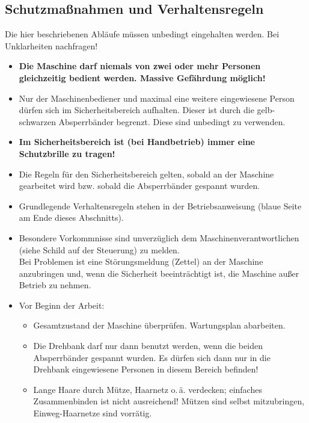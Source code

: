 \documentclass{\basedir/fablab-document}
\begin{document}
\subsection{Schutzmaßnahmen und Verhaltensregeln}
Die hier beschriebenen Abläufe müssen unbedingt eingehalten werden.
Bei Unklarheiten nachfragen!
\begin{itemize}
\item \textbf{Die Maschine darf niemals von zwei oder mehr Personen gleichzeitig bedient werden. Massive Gefährdung möglich!}
\item Nur der Maschinenbediener und maximal eine weitere eingewiesene Person dürfen sich im Sicherheitsbereich aufhalten. Dieser ist durch die gelb-schwarzen Absperrbänder begrenzt. Diese sind unbedingt zu verwenden.
\item \textbf{Im Sicherheitsbereich ist (bei Handbetrieb) immer eine Schutzbrille zu tragen!}
\item Die Regeln für den Sicherheitsbereich gelten, sobald an der Maschine gearbeitet wird bzw. sobald die Absperrbänder gespannt wurden.
\item Grundlegende Verhaltensregeln stehen in der Betriebsanweisung (blaue Seite am Ende dieses Abschnitts).
\item Besondere Vorkommnisse sind unverzüglich dem Maschinenverantwortlichen (siehe Schild auf der Steuerung) zu melden.\\
Bei Problemen ist eine Störungsmeldung (Zettel) an der Maschine anzubringen und, wenn die Sicherheit beeinträchtigt ist, die Maschine außer Betrieb zu nehmen.

\item Vor Beginn der Arbeit:
\begin{itemize}
\item Gesamtzustand der Maschine überprüfen. Wartungsplan abarbeiten.
\item Die Drehbank darf nur dann benutzt werden, wenn die beiden Absperrbänder gespannt wurden. Es dürfen sich dann nur in die Drehbank eingewiesene Personen in diesem Bereich befinden!
\item Lange Haare durch Mütze, Haarnetz o.\,ä. verdecken; einfaches Zusammenbinden ist nicht ausreichend! Mützen sind selbst mitzubringen, Einweg-Haarnetze sind vorrätig.
\end{itemize}


\end{itemize}
\end{document}
